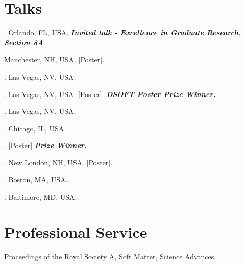 \documentclass[10pt, singlespace]{article}
\begin{document}
\section{Talks}
\begin{bibenum*}
    \item {}. Orlando, FL, USA. \textbf{\textit{Invited talk - Excellence in Graduate Research, Section 8A}}
    \item {} Manchester, NH, USA. [Poster].
    \item {}. Las Vegas, NV, USA.
    \item {}. Las Vegas, NV, USA. [Poster]. \textbf{\textit{DSOFT Poster Prize Winner.}}
    \item {}. Las Vegas, NV, USA. 
    \item {}. Chicago, IL, USA.
    \item {}. [Poster] \textbf{\textit{Prize Winner.}}
    \item {}. New London, NH, USA. [Poster].
    \item {}. Boston, MA, USA. 
    \item {}. Baltimore, MD, USA.
\end{bibenum*}
    
\section{Professional Service}
\begin{description}[noitemsep]
\item[Journal Reviewer:] Proceedings of the Royal Society A, Soft Matter, Science Advances.
\end{description}
\end{document}

